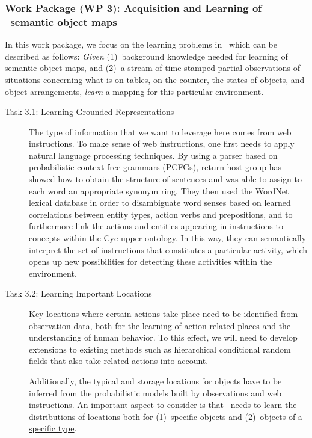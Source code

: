 \subsubsection{Work Package (WP 3): Acquisition and Learning of \ksem\ semantic object maps}
\label{sec:wp3}
In this work package, we focus on the learning problems in 
\ksem\ which can be described as follows: \emph{Given} (1)~background
knowledge needed for learning of semantic object maps,  and (2)~a stream
of time-stamped partial observations of situations concerning what is
on tables, on the counter, the states of objects, and object
arrangements, \emph{learn} a mapping for this particular environment.
\begin{description}
\item[Task 3.1: Learning Grounded Representations] The
  type of information that we want to leverage here comes from web instructions.
  To make sense of web instructions, one first needs to apply natural language
  processing techniques. By using a parser based on probabilistic
  context-free grammars (PCFGs),
  return host group has showed how to obtain the structure of sentences and was able to assign to each word an appropriate synonym ring.
  They then used the WordNet lexical database in order to disambiguate word senses based on learned
  correlations between entity types, action verbs and prepositions, and to furthermore
  link the actions and entities appearing in instructions to concepts within the Cyc
  upper ontology. In this way, they can semantically interpret the set of instructions that
  constitutes a particular activity, which opens up 
  new possibilities for detecting these activities within the environment.

\item[Task 3.2: Learning Important Locations] 
  Key locations where certain actions take place need to be identified from
  observation data, both for the learning of action-related places
  and the understanding of human behavior. To this effect, we will need to develop extensions
  to existing methods such as hierarchical conditional random fields
  that also take related actions into account.

  Additionally, the typical and storage locations for objects have to
  be inferred from the probabilistic models built by observations and
  web instructions.
  An important aspect to consider is that \ksem\ needs to learn the distributions
  of locations both for (1)~\underline{specific objects} and (2)~objects of a
  \underline{specific type}.


\end{description}
